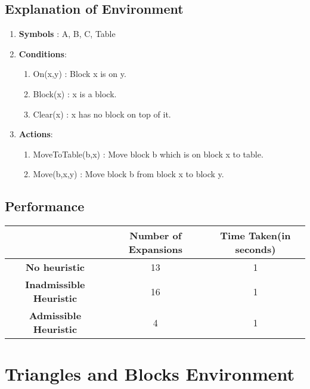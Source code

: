 \documentclass[12pt]{article}
\begin{document}
\subsection{Explanation of Environment}
\begin{enumerate}
    \item \textbf{Symbols} : A, B, C, Table
    
    \item \textbf{Conditions}:
    \begin{enumerate}
        \item On(x,y) : Block x is on y.
        \item Block(x) : x is a block.
        \item Clear(x) : x has no block on top of it.
    \end{enumerate}
    
    \item \textbf{Actions}:
    \begin{enumerate}
        \item MoveToTable(b,x) : Move block b which is on block x to table.
        \item Move(b,x,y) : Move block b from block x to block y.
    \end{enumerate}
\end{enumerate}

\subsection{Performance}
\begin{center}
\begin{tabular}{| c | c | c |}
\hline
  & \textbf{Number of Expansions} & \textbf{Time Taken(in seconds)} \\ 
 \hline
 \textbf{No heuristic} & 13 & 1 \\  
 \hline
 \textbf{Inadmissible Heuristic} & 16 & 1 \\   
 \hline
 \textbf{Admissible Heuristic} & 4 & 1 \\
\hline
\end{tabular}
\end{center}

\newpage
\section{Triangles and Blocks Environment}
\end{document}
